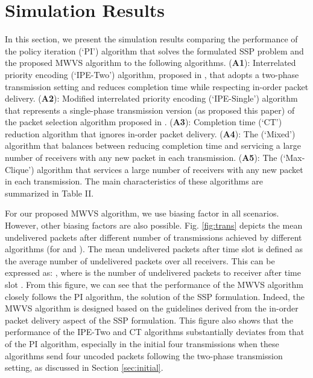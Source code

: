\documentclass[12pt, peerreview, onecolumn]{IEEEtran}
\begin{document}
\vspace{-5mm}
\section{Simulation Results} \label{results}
In this section, we  present the simulation results comparing  the performance of the policy iteration (`PI') algorithm that solves the formulated SSP problem  and the proposed  MWVS algorithm to the following   algorithms. (\textbf{A1}): Interrelated priority encoding   (`IPE-Two') algorithm, proposed in  \cite{wanginstantly}, that adopts a two-phase transmission setting  and  reduces completion time  while respecting in-order packet delivery.  (\textbf{A2}): Modified interrelated priority encoding   (`IPE-Single') algorithm  that represents  a single-phase transmission version (as proposed this paper) of the  packet selection algorithm proposed in  \cite{wanginstantly}.  (\textbf{A3}): Completion time   (`CT') reduction algorithm \cite{sorour2012completion}  that ignores in-order packet delivery. (\textbf{A4}):  The  (`Mixed') algorithm \cite{aboutorabenabling}  that balances between reducing  completion time and servicing a large number of receivers with any new packet in each transmission. (\textbf{A5}): The  (`Max-Clique') algorithm \cite{le2013instantly}  that services a large number of receivers with any new packet in each transmission. The main characteristics of these algorithms are summarized in Table II.





For our proposed MWVS algorithm, we use biasing factor     in all scenarios. However, other biasing factors  are also possible. Fig. \ref{fig:trans} depicts the  mean undelivered packets after different number of transmissions achieved by different algorithms (for  and ).\footnotemark {}  The  mean undelivered packets after time slot  is defined as the average  number of undelivered packets over all receivers. This can be expressed as: , where   is the number of undelivered packets to receiver  after time slot .   From this figure,  we can see that the performance  of the MWVS algorithm closely follows   the PI algorithm, the solution of the SSP formulation. Indeed, the MWVS algorithm is designed based on the guidelines derived from the in-order packet delivery aspect of the SSP formulation. This figure also shows that the performance of the  IPE-Two and CT algorithms substantially deviates from that of the PI algorithm, especially in the initial  four transmissions when these algorithms send four uncoded packets following the two-phase transmission setting, as discussed in Section \ref{sec:initial}.
\end{document}
